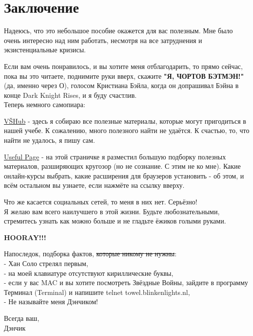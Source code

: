 \documentclass[a4paper,12pt]{article}
\begin{document}
\newpage

\section{Заключение}

Надеюсь, что это небольшое пособие окажется для вас полезным. 
Мне было очень интересно над ним работать, несмотря на все затруднения 
и экзистенциальные кризисы.

Если вам очень понравилось, и вы хотите меня отблагодарить,
то прямо сейчас, пока вы это читаете, поднимите руки вверх, 
скажите \textbf{"Я, ЧОРТОВ БЭТМЭН!"} (да, именно через О), голосом Кристиана Бэйла, 
когда он допрашивал Бэйна в конце Dark Knight Rises, и я буду счастлив. \\

Теперь немного самопиара:

\href{http://vshub.wordpress.com}{VŠHub} - здесь я собираю все полезные материалы, 
которые могут пригодиться в нашей учебе. К сожалению, много полезного найти не удаётся.
К счастью, то, что найти не удалось, я пишу сам.

\href{https://hunfauser.github.io/usefulpage/}{Useful Page} - на этой страничке 
я разместил большую подборку полезных материалов, разширяющих кругозор (но не сознание. 
С этим не ко мне). Какие онлайн-курсы выбрать, какие расширения для браузеров установить - об 
этом, и всём остальном вы узнаете, если нажмёте на ссылку вверху.

Что же касается социальных сетей, то меня в них нет. Серьёзно! \\

Я желаю вам всего наилучшего в этой жизни. Будьте любознательными, стремитесь узнать как можно больше
и не гладьте ёжиков голыми руками. \\

\vspace{7ex}

\textbf{HOORAY!!!}

\vspace{7ex}

Напоследок, подборка фактов, \sout{которые никому не нужны}: \\
- Хан Соло стрелял первым, \\
- на моей клавиатуре отсутствуют кириллические буквы, \\
- если у вас MAC и вы хотите посмотреть Звёздные Войны, 
зайдите в программу Терминал (Terminal) и напишите telnet towel.blinkenlights.nl, \\
- Не называйте меня Дэнчиком!

\centering
\vfill
Всегда ваш, \\
Дэнчик
\end{document}
